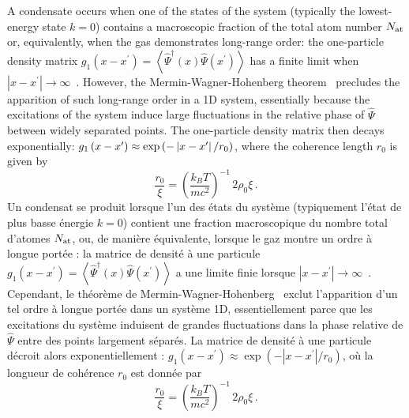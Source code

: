 \documentclass[aps,prd,notitlepage,amsfonts,amssymb,amsmath,nofootinbib,superscriptaddress,longbibliography]{revtex4-2}
\newcommand{\trad}[1]{\textcolor{tradcolor}{#1}}
\begin{document}
A condensate occurs when one of the states of the system (typically the lowest-energy state $k=0$) contains a macroscopic fraction of the total atom number $N_{\rm at}$ or, equivalently, when the gas demonstrates long-range order: the one-particle density matrix $g_{1}\left(x-x^{\prime}\right) = \left\langle \hat{\Psi}^{\dagger}\left(x\right) \hat{\Psi}\left(x^{\prime}\right) \right\rangle$ has a finite limit when $\left|x-x^{\prime}\right| \to \infty$~\cite{Penrose-Onsager-1956}.  However, the Mermin-Wagner-Hohenberg theorem~\cite{Hohenberg1967, Pitaevskii2016} precludes the apparition of such long-range order in a 1D system, essentially because the excitations of the system induce large fluctuations in the relative phase of $\hat{\Psi}$ between widely separated points.  The one-particle density matrix then decays exponentially: $g_{1}\left(x-x^{\prime}\right) \approx {\rm exp}\left(-\left|x-x^{\prime}\right|/r_{0}\right)$, where the coherence length $r_{0}$ is given by~\cite{Pitaevskii2016}
\begin{equation}
\label{def:coherence_length}
\frac{r_0}{\xi}  =  \left( \frac{k_{B}T}{mc^{2}} \right)^{-1} \, 2 \rho_0 \xi \, .
\end{equation}
\trad{
Un condensat se produit lorsque l'un des états du système (typiquement l'état de plus basse énergie \( k = 0 \)) contient une fraction macroscopique du nombre total d'atomes \( N_{\rm at} \), ou, de manière équivalente, lorsque le gaz montre un ordre à longue portée : la matrice de densité à une particule \( g_{1}\left(x-x^{\prime}\right) = \left\langle \hat{\Psi}^{\dagger}\left(x\right) \hat{\Psi}\left(x^{\prime}\right) \right\rangle \) a une limite finie lorsque \( \left|x-x^{\prime}\right| \to \infty \)~\cite{Penrose-Onsager-1956}. Cependant, le théorème de Mermin-Wagner-Hohenberg~\cite{Hohenberg1967, Pitaevskii2016} exclut l'apparition d'un tel ordre à longue portée dans un système 1D, essentiellement parce que les excitations du système induisent de grandes fluctuations dans la phase relative de \(\hat{\Psi}\) entre des points largement séparés. La matrice de densité à une particule décroit alors exponentiellement : \( g_{1}\left(x-x^{\prime}\right) \approx \exp\left(-\left|x-x^{\prime}\right|/r_{0}\right) \), où la longueur de cohérence \( r_{0} \) est donnée par~\cite{Pitaevskii2016}
\begin{equation*}
\frac{r_0}{\xi}  =  \left( \frac{k_{B}T}{mc^{2}} \right)^{-1} \, 2 \rho_0 \xi \, .
\end{equation*}
}
\end{document}
